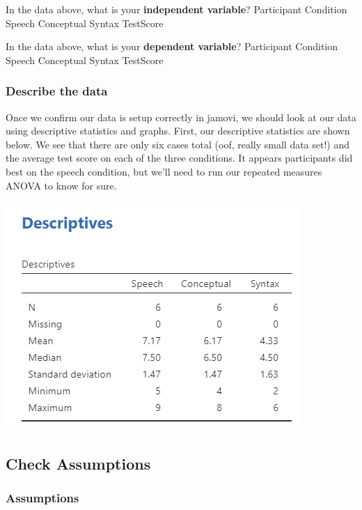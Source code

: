 \documentclass[
]{book}
\begin{document}
In the data above, what is your \textbf{independent variable}? Participant Condition Speech Conceptual Syntax TestScore

In the data above, what is your \textbf{dependent variable}? Participant Condition Speech Conceptual Syntax TestScore

\hypertarget{describe-the-data-5}{%
\subsubsection{Describe the data}\label{describe-the-data-5}}

Once we confirm our data is setup correctly in jamovi, we should look at our data using descriptive statistics and graphs. First, our descriptive statistics are shown below. We see that there are only six cases total (oof, really small data set!) and the average test score on each of the three conditions. It appears participants did best on the speech condition, but we'll need to run our repeated measures ANOVA to know for sure.

\includegraphics{images/05-repeated-measures-anova/rm_descriptives.png}

\hypertarget{check-assumptions-5}{%
\subsection{Check Assumptions}\label{check-assumptions-5}}

\hypertarget{assumptions-4}{%
\subsubsection{Assumptions}\label{assumptions-4}}
\end{document}
